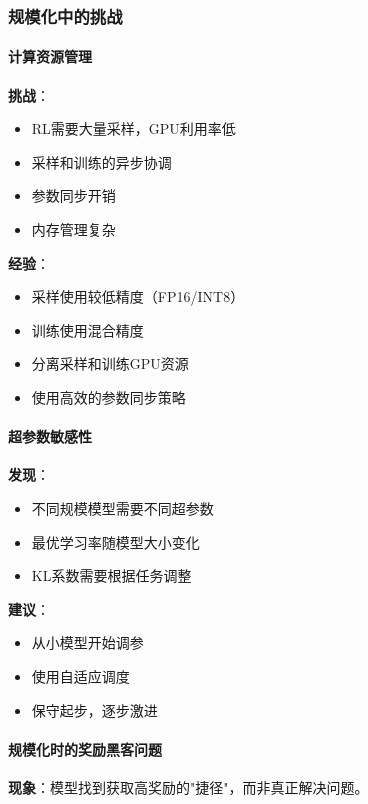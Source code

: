 \documentclass[12pt,a4paper]{article}
\begin{document}
\subsubsection{规模化中的挑战}

\paragraph{计算资源管理}

\textbf{挑战}：
\begin{itemize}
    \item RL需要大量采样，GPU利用率低
    \item 采样和训练的异步协调
    \item 参数同步开销
    \item 内存管理复杂
\end{itemize}

\textbf{经验}：
\begin{itemize}
    \item 采样使用较低精度（FP16/INT8）
    \item 训练使用混合精度
    \item 分离采样和训练GPU资源
    \item 使用高效的参数同步策略
\end{itemize}

\paragraph{超参数敏感性}

\textbf{发现}：
\begin{itemize}
    \item 不同规模模型需要不同超参数
    \item 最优学习率随模型大小变化
    \item KL系数需要根据任务调整
\end{itemize}

\textbf{建议}：
\begin{itemize}
    \item 从小模型开始调参
    \item 使用自适应调度
    \item 保守起步，逐步激进
\end{itemize}

\paragraph{规模化时的奖励黑客问题}

\textbf{现象}：模型找到获取高奖励的"捷径"，而非真正解决问题。
\end{document}
